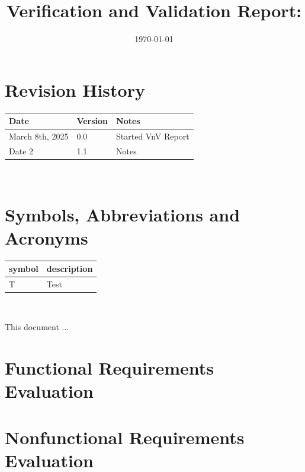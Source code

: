\documentclass[12pt, titlepage]{article}
\begin{document}
\title{Verification and Validation Report: \progname} 
\author{\authname}
\date{\today}
	
\maketitle


\section{Revision History}

\begin{tabularx}{\textwidth}{p{3cm}p{2cm}X}
\toprule {\bf Date} & {\bf Version} & {\bf Notes}\\
\midrule
March 8th, 2025 & 0.0 & Started VnV Report\\
Date 2 & 1.1 & Notes\\
\bottomrule
\end{tabularx}

~\newpage

\section{Symbols, Abbreviations and Acronyms}

\renewcommand{\arraystretch}{1.2}
\begin{tabular}{l l} 
  \toprule		
  \textbf{symbol} & \textbf{description}\\
  \midrule 
  T & Test\\
  \bottomrule
\end{tabular}\\


\newpage

\tableofcontents

\listoftables %

\listoffigures %

\newpage


This document ...

\section{Functional Requirements Evaluation}

\section{Nonfunctional Requirements Evaluation}
\end{document}
